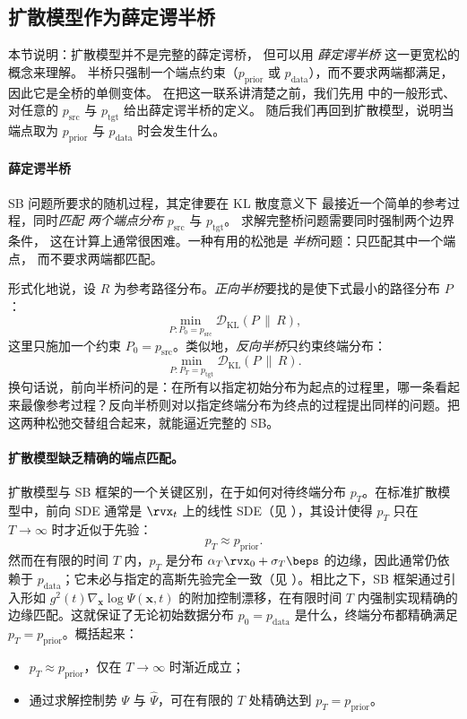 \subsection{扩散模型作为薛定谔半桥}

本节说明：扩散模型并不是完整的薛定谔桥，
但可以用 \emph{薛定谔半桥} 这一更宽松的概念来理解。
半桥只强制一个端点约束（$p_{\mathrm{prior}}$ 或 $p_{\mathrm{data}}$），而不要求两端都满足，
因此它是全桥的单侧变体。
在把这一联系讲清楚之前，我们先用  中的一般形式、
对任意的 $p_{\mathrm{src}}$ 与 $p_{\mathrm{tgt}}$ 给出薛定谔半桥的定义。
随后我们再回到扩散模型，说明当端点取为 $p_{\mathrm{prior}}$ 与 $p_{\mathrm{data}}$ 时会发生什么。


\paragraph{薛定谔半桥}

SB 问题所要求的随机过程，其定律要在 KL 散度意义下
最接近一个简单的参考过程，同时\emph{匹配
两个端点分布} $p_{\mathrm{src}}$ 与 $p_{\mathrm{tgt}}$。
求解完整桥问题需要同时强制两个边界条件，
这在计算上通常很困难。一种有用的松弛是
\emph{半桥}问题：只匹配其中一个端点，
而不要求两端都匹配。

形式化地说，设 $R$ 为参考路径分布。\emph{正向半桥}要找的是使下式最小的路径分布 $P$：
\[
    \min_{P: P_0 = p_{\mathrm{src}}}
    \mathcal{D}_{\mathrm{KL}}(P \,\|\, R),
\]
这里只施加一个约束 $P_0 = p_{\mathrm{src}}$。类似地，\emph{反向半桥}只约束终端分布：
\[
    \min_{P: P_T = p_{\mathrm{tgt}}}
    \mathcal{D}_{\mathrm{KL}}(P \,\|\, R).
\]
换句话说，前向半桥问的是：在所有以指定初始分布为起点的过程里，哪一条看起来最像参考过程？反向半桥则对以指定终端分布为终点的过程提出同样的问题。把这两种松弛交替组合起来，就能逼近完整的 SB。


\paragraph{扩散模型缺乏精确的端点匹配。}
扩散模型与 SB 框架的一个关键区别，在于如何对待终端分布 $p_T$。在标准扩散模型中，前向 SDE 通常是 $\rvx_t$ 上的线性 SDE（见 ），其设计使得 $p_T$ 只在 $T \to \infty$ 时才近似于先验：
\[
    p_T \approx p_{\mathrm{prior}}.
\]
然而在有限的时间 $T$ 内，$p_T$ 是分布
$\alpha_T\rvx_0+\sigma_T\beps$ 的边缘，因此通常仍依赖于
$p_{\mathrm{data}}$；它未必与指定的高斯先验完全一致（见 ）。相比之下，SB 框架通过引入形如 $g^2(t)\nabla_\mathbf{x}\log \Psi(\mathbf{x}, t)$ 的附加控制漂移，在有限时间 $T$ 内强制实现精确的边缘匹配。这就保证了无论初始数据分布 $p_0 = p_{\mathrm{data}}$ 是什么，终端分布都精确满足 $p_T = p_{\mathrm{prior}}$。概括起来：
\begin{itemize}
    \item {} $p_T \approx p_{\mathrm{prior}}$，仅在 $T \to \infty$ 时渐近成立；
    \item {} 通过求解控制势 $\Psi$ 与 $\widehat{\Psi}$，可在有限的 $T$ 处精确达到 $p_T = p_{\mathrm{prior}}$。
\end{itemize}


